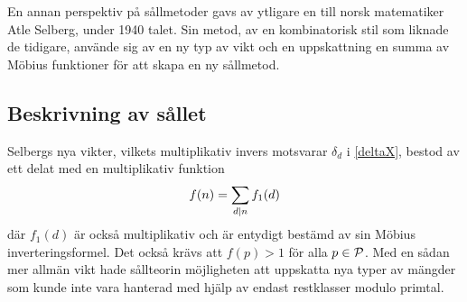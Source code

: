 En annan perspektiv på sållmetoder gavs av ytligare en till norsk matematiker Atle Selberg, under 1940 talet. Sin metod, av en kombinatorisk stil som liknade de tidigare, använde sig av en ny typ av vikt och en uppskattning en summa av Möbius funktioner för att skapa en ny sållmetod.

\subsection{Beskrivning av sållet}
Selbergs nya vikter, vilkets multiplikativ invers motsvarar \(\delta_d\) i \eqref{deltaX}, bestod av ett delat med en multiplikativ funktion 
\begin{equation}
    f(n) = \sum_{d\divides n}f_1(d)\nonumber
\end{equation}
där \(f_1(d)\) är också multiplikativ och är entydigt bestämd av sin Möbius inverteringsformel. Det också krävs att \(f(p) > 1\) för alla \(p\in\P\). Med en sådan mer allmän vikt hade sållteorin möjligheten att uppskatta nya typer av mängder som kunde inte vara hanterad med hjälp av endast restklasser modulo primtal. 

